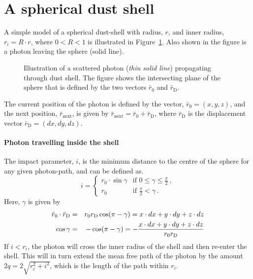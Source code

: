 \documentclass[a4paper,12pt]{article}
\newcommand{\poslen}{r_\mathrm{0}}
\newcommand{\dislen}{r_\mathrm{D}}
\newcommand{\posvec}{\bar{r}_\mathrm{0}}
\newcommand{\disvec}{\bar{r}_\mathrm{D}}
\newcommand{\nexvec}{\bar{r}_\mathrm{next}}
\begin{document}
\section*{A spherical dust shell}
A simple model of a spherical dust-shell with radius, $r$, and inner
radius, $r_i = R\cdot r$, where $0<R<1$ is illustrated in
Figure~\ref{fig:sphere}. Also shown in the figure is a photon leaving
the sphere (solid line).
\begin{figure}[ht]
  \centering
  
  \caption{Illustration of a scattered photon (\emph{thin solid line})
    propagating through dust shell. The figure shows the intersecting
    plane of the sphere that is defined by the two vectors $\posvec$
    and $\disvec$.\label{fig:sphere}}
\end{figure}
The current position of the photon is defined by the vector, $\posvec
= (x,y,z)$, and the next position, $\nexvec$, is given by $\nexvec =
\posvec+\disvec$, where $\disvec$ is the displacement vector $\disvec
= (dx,dy,dz)$.

\paragraph{Photon travelling inside the shell} The impact parameter,
$i$, is the minimum distance to the centre of the sphere for any given
photon-path, and can be defined as.
\[
i = \left\{%
  \begin{array}{ll}
    \poslen\cdot\sin\gamma & \textrm{if } 0 \leq \gamma \leq \frac{\pi}{2}\,,\\
    \poslen                & \textrm{if } \frac{\pi}{2} < \gamma\,.
  \end{array} \right.
\]
Here, $\gamma$ is given by
\begin{eqnarray*}
  \posvec\cdot\disvec & = & \poslen\dislen\cos(\pi-\gamma) = 
  x\cdot dx + y\cdot dy + z\cdot dz\\
  \cos\gamma & = & -\cos(\pi-\gamma) = -\frac{x\cdot dx + y\cdot dy + z\cdot dz}{%
    \poslen\dislen}
\end{eqnarray*}
If $i < r_i$, the photon will cross the inner radius of the shell and
then re-enter the shell. This will in turn extend the mean free path
of the photon by the amount $2q = 2\sqrt{r_i^2 + i^2}$, which is the
length of the path within $r_i$.
\end{document}
